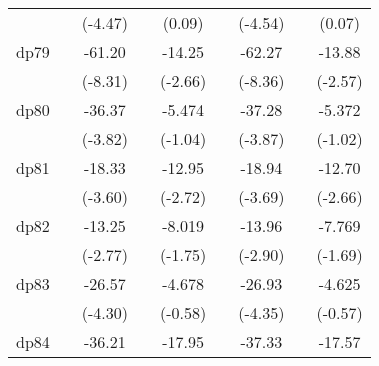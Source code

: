 {\begin{tabular}{l*{8}{c}}
            &                     &     (-4.47)         &                     &      (0.09)         &                     &     (-4.54)         &                     &      (0.07)         \\
[1em]
dp79        &                     &      -61.20\sym{***}&                     &      -14.25\sym{**} &                     &      -62.27\sym{***}&                     &      -13.88\sym{*}  \\
            &                     &     (-8.31)         &                     &     (-2.66)         &                     &     (-8.36)         &                     &     (-2.57)         \\
[1em]
dp80        &                     &      -36.37\sym{***}&                     &      -5.474         &                     &      -37.28\sym{***}&                     &      -5.372         \\
            &                     &     (-3.82)         &                     &     (-1.04)         &                     &     (-3.87)         &                     &     (-1.02)         \\
[1em]
dp81        &                     &      -18.33\sym{***}&                     &      -12.95\sym{**} &                     &      -18.94\sym{***}&                     &      -12.70\sym{**} \\
            &                     &     (-3.60)         &                     &     (-2.72)         &                     &     (-3.69)         &                     &     (-2.66)         \\
[1em]
dp82        &                     &      -13.25\sym{**} &                     &      -8.019         &                     &      -13.96\sym{**} &                     &      -7.769         \\
            &                     &     (-2.77)         &                     &     (-1.75)         &                     &     (-2.90)         &                     &     (-1.69)         \\
[1em]
dp83        &                     &      -26.57\sym{***}&                     &      -4.678         &                     &      -26.93\sym{***}&                     &      -4.625         \\
            &                     &     (-4.30)         &                     &     (-0.58)         &                     &     (-4.35)         &                     &     (-0.57)         \\
[1em]
dp84        &                     &      -36.21\sym{***}&                     &      -17.95\sym{***}&                     &      -37.33\sym{***}&                     &      -17.57\sym{***}\\

\end{tabular}}
